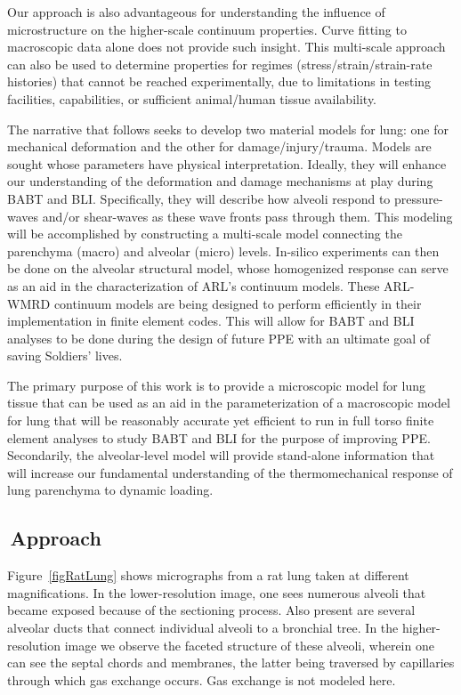 Our approach is also advantageous for understanding the influence of microstructure on the higher-scale continuum properties.  Curve fitting to macroscopic data alone does not provide such insight.  This multi-scale approach can also be used to determine properties for regimes (stress\slash strain\slash strain-rate histories) that cannot be reached experimentally, due to limitations in testing facilities, capabilities, or sufficient animal\slash human tissue availability. 

The narrative that follows seeks to develop two material models for lung: one for mechanical deformation and the other for damage\slash injury\slash trauma.  Models are sought whose parameters have physical interpretation.  Ideally, they will enhance our understanding of the deformation and damage mechanisms at play during BABT and BLI.  Specifically, they will describe how alveoli respond to pressure-waves and\slash or shear-waves as these wave fronts pass through them.  This modeling will be accomplished by constructing a multi-scale model connecting the parenchyma (macro) and alveolar (micro) levels.  In-silico experiments can then be done on the alveolar structural model, whose homogenized response can serve as an aid in the characterization of ARL's continuum models.  These ARL-WMRD continuum models are being designed to perform efficiently in their implementation in finite element codes.  This will allow for BABT and BLI analyses to be done during the design of future PPE with an ultimate goal of saving Soldiers' lives.

The primary purpose of this work is to provide a micro\-scopic model for lung tissue that can be used as an aid in the parameterization of a macro\-scopic model for lung that will be reasonably accurate yet efficient to run in full torso finite element analyses \cite{clayton2020TRL} to study BABT and BLI for the purpose of improving PPE.  Secondarily, the alveolar-level model will provide stand-alone information that will increase our fundamental understanding of the thermomechanical response of lung parenchyma to dynamic loading.  

\subsection{$\,$Approach}

Figure~\ref{figRatLung} shows micrographs from a rat lung taken at different magnifications. In the lower-resolution image, one sees numerous alveoli that became exposed because of the sectioning process.  Also present are several alveolar ducts that connect individual alveoli to a bronchial tree.  In the higher-resolution image we observe the faceted structure of these alveoli, wherein one can see the septal chords and membranes, the latter being traversed by capillaries through which gas exchange occurs.  Gas exchange is not modeled here.

